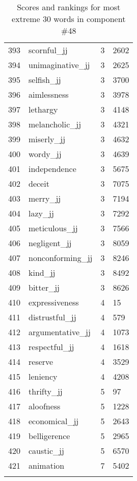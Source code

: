 \begin{longtable}[!htbp]{| rlr@{.}l |}
    393 & scornful\_jj & 3 & 2602 \\
    394 & unimaginative\_jj & 3 & 2625 \\
    395 & selfish\_jj & 3 & 3700 \\
    396 & aimlessness & 3 & 3978 \\
    397 & lethargy & 3 & 4148 \\
    398 & melancholic\_jj & 3 & 4321 \\
    399 & miserly\_jj & 3 & 4632 \\
    400 & wordy\_jj & 3 & 4639 \\
    401 & independence & 3 & 5675 \\
    402 & deceit & 3 & 7075 \\
    403 & merry\_jj & 3 & 7194 \\
    404 & lazy\_jj & 3 & 7292 \\
    405 & meticulous\_jj & 3 & 7566 \\
    406 & negligent\_jj & 3 & 8059 \\
    407 & nonconforming\_jj & 3 & 8246 \\
    408 & kind\_jj & 3 & 8492 \\
    409 & bitter\_jj & 3 & 8626 \\
    410 & expressiveness & 4 & 15 \\
    411 & distrustful\_jj & 4 & 579 \\
    412 & argumentative\_jj & 4 & 1073 \\
    413 & respectful\_jj & 4 & 1618 \\
    414 & reserve & 4 & 3529 \\
    415 & leniency & 4 & 4208 \\
    416 & thrifty\_jj & 5 & 97 \\
    417 & aloofness & 5 & 1228 \\
    418 & economical\_jj & 5 & 2643 \\
    419 & belligerence & 5 & 2965 \\
    420 & caustic\_jj & 5 & 6570 \\
    421 & animation & 7 & 5402 \\
    \hline
    \caption{Scores and rankings for most extreme 30 words in component \#48} \\
\end{longtable}
